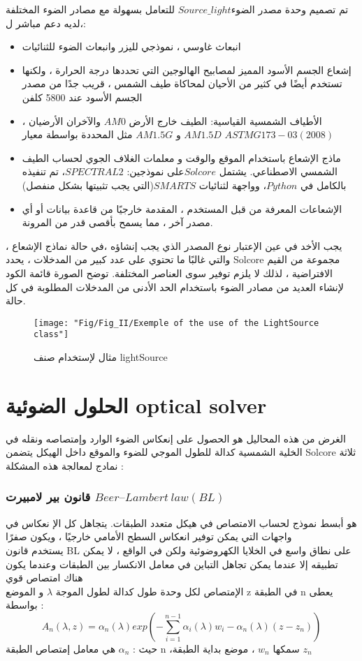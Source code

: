 تم تصميم وحدة مصدر الضوء$ Source\_light $ للتعامل بسهولة مع مصادر الضوء المختلفة ،لديه دعم مباشر ل: 
\begin{itemize}
	\item 
	انبعاث غاوسي ، نموذجي لليزر وانبعاث الضوء للثنائيات 
	\item 
	إشعاع الجسم الأسود المميز لمصابيح الهالوجين التي تحددها درجة الحرارة ، ولكنها تستخدم أيضًا في كثير من الأحيان لمحاكاة طيف الشمس ، قريب جدًا من مصدر الجسم  الأسود عند 5800 كلفن
	\item 
	الأطياف الشمسية القياسية: الطيف خارج الأرض $ AM0 $ والآخران الأرضيان ، $ AM1.5D $ و $ AM1.5G $ مثل المحددة بواسطة معيار $ ASTM G173-03 (2008) $ 
	\item 
	ماذج الإشعاع باستخدام الموقع والوقت و معلمات الغلاف الجوي لحساب الطيف الشمسي الاصطناعي. يشتمل $ Solcore  $على نموذجين: $ SPECTRAL2  $، تم تنفيذه بالكامل في $ Python  $، وواجهة لثنائيات $ SMARTS  $(التي يجب تثبيتها بشكل منفصل)
	\item 
	الإشعاعات المعرفة من قبل المستخدم ، المقدمة خارجيًا من قاعدة بيانات أو أي مصدر آخر ، مما يسمح بأقصى قدر من المرونة.
\end{itemize}
يجب الأخد في عين الإعتبار نوع المصدر الذي يجب إنشاؤه  ،في حالة نماذج الإشعاع ، والتي غالبًا ما تحتوي على عدد كبير من المدخلات ، يحدد Solcore مجموعة من القيم الافتراضية ، لذلك لا يلزم توفير سوى العناصر المختلفة. توضح الصورة قائمة الكود  لإنشاء العديد من مصادر الضوء باستخدام الحد الأدنى من المدخلات المطلوبة في كل حالة.  
\begin{figure}[h!]
	\centering
	\texttt{[image: "Fig/Fig\_II/Exemple of the use of the LightSource class"]}
	\caption{مثال لإستخدام صنف lightSource}
	\label{fig:exemple-of-the-use-of-the-lightsource-class}
\end{figure}
\FloatBarrier
\section{    الحلول الضوئية optical solver }
الغرض من هذه المحاليل هو الحصول على إنعكاس الضوء الوارد وإمتصاصه ونقله في الخلية الشمسية كدالة للطول الموجي للضوء والموقع داخل الهيكل 
يتضمن Solcore ثلاثة نمادج لمعالجة هذه المشكلة : 
\subsubsection{قانون بير لامبيرت $ Beer–Lambert ~law (BL) $}

هو أبسط نموذج لحساب الامتصاص في هيكل متعدد الطبقات. يتجاهل كل الإ نعكاس في واجهات التي يمكن توفير انعكاس السطح الأمامي خارجيًا ، ويكون صفرًا  \\
يستخدم قانون BL على نطاق واسع في الخلايا الكهروضوئية ولكن في الواقع ، لا يمكن تطبيقه إلا عندما يمكن تجاهل التباين في معامل الانكسار بين الطبقات وعندما يكون هناك امتصاص قوي \\
الإمتصاص لكل وحدة طول كدالة لطول الموجة  $\lambda$ و الموضع z في الطبقة n يعطى بواسطة :\\
\begin{equation}
	A_n(\lambda,z)=\alpha_n(\lambda)exp(-\sum_{i=1}^{ n-1}\alpha_i(\lambda)w_i-\alpha_ n ( \lambda )(z-z_n))
\end{equation}
حيث : $\alpha_n$ هي معامل إمتصاص الطبقة n  ،سمكها  $ w_n $ ، موضع بداية الطبقة $  z_n $
